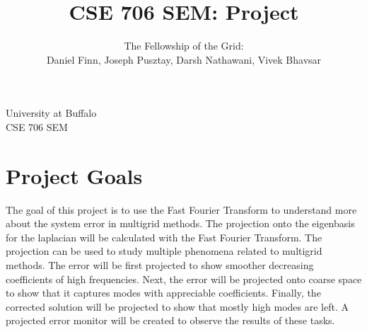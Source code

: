 \documentclass{article}
\begin{document}
\begin{titlepage}

\title{CSE 706 SEM: Project}
\author{The Fellowship of the Grid: \\
Daniel Finn, Joseph Pusztay, Darsh Nathawani, Vivek Bhavsar}
\date{}
\maketitle
	\begin{center}
		University at Buffalo\\
		CSE 706 SEM\\
	\end{center}
\end{titlepage}

\section{Project Goals}

The goal of this project is to use the Fast Fourier Transform to understand more about the system error in multigrid methods.  The projection onto the eigenbasis for the laplacian will be calculated with the Fast Fourier Transform.   The projection can be used to study multiple phenomena related to multigrid methods.  The error will be first projected to show smoother decreasing coefficients of high frequencies.  Next, the error will be projected onto coarse space to show that it captures modes with appreciable coefficients.  Finally, the corrected solution will be projected to show that mostly high modes are left.  A projected error monitor will be created to observe the results of these tasks.
\end{document}
